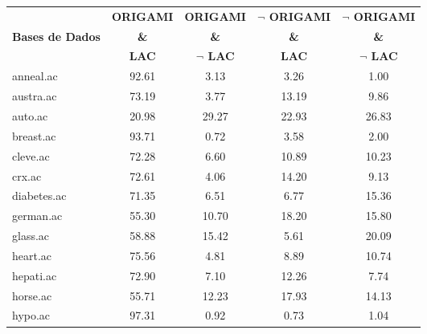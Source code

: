 \begin{table}[htbp]
	\centering
		\renewcommand{\tabcolsep}{1.8mm}
		\begin{tabular}{|l|c|c|c|c|}
		\hline
				& \textbf{ORIGAMI}	& \textbf{ORIGAMI}		& \textbf{$\neg$ ORIGAMI}	& \textbf{$\neg$ ORIGAMI}	\\
		\textbf{Bases de Dados}	& \textbf{\&}		& \textbf{\&}			& \textbf{\&}			& \textbf{\&}			\\
				&  \textbf{LAC}		& \textbf{$\neg$ LAC}		& \textbf{LAC}			& \textbf{$\neg$ LAC}		\\
		\hline
		anneal.ac       & 92.61         & 3.13               & 3.26                     & 1.00                          \\
		\hline
		austra.ac       & 73.19         & 3.77               & 13.19                    & 9.86                          \\
		\hline
		auto.ac         & 20.98         & 29.27              & 22.93                    & 26.83                         \\
		\hline
		breast.ac       & 93.71         & 0.72               & 3.58                     & 2.00                          \\
		\hline
		cleve.ac        & 72.28         & 6.60               & 10.89                    & 10.23                         \\
		\hline
		crx.ac          & 72.61         & 4.06               & 14.20                    & 9.13                          \\
		\hline
		diabetes.ac     & 71.35         & 6.51               & 6.77                     & 15.36                         \\
		\hline
		german.ac       & 55.30         & 10.70              & 18.20                    & 15.80                         \\
		\hline
		glass.ac        & 58.88         & 15.42              & 5.61                     & 20.09                         \\
		\hline
		heart.ac        & 75.56         & 4.81               & 8.89                     & 10.74                         \\
		\hline
		hepati.ac       & 72.90         & 7.10               & 12.26                    & 7.74                          \\
		\hline
		horse.ac        & 55.71         & 12.23              & 17.93                    & 14.13                         \\
		\hline
		hypo.ac         & 97.31         & 0.92               & 0.73                     & 1.04                          \\

\end{tabular}
\end{table}
